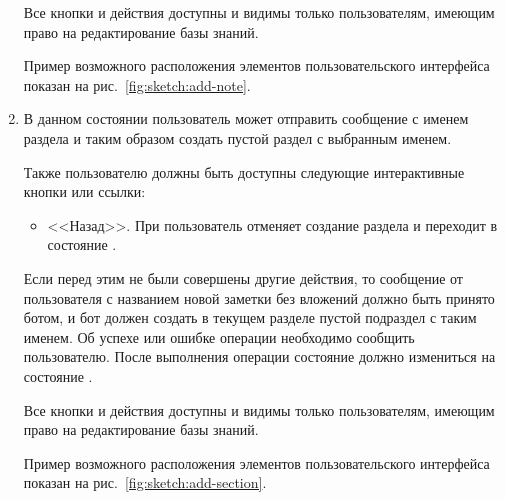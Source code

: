 \begin{enumerate}
            Все кнопки и действия доступны и видимы только пользователям, имеющим право на редактирование
            базы знаний.

            Пример возможного расположения элементов пользовательского интерфейса показан на
            рис.~\ref{fig:sketch:add-note}.

        \item \label{itm:req:ui:states:create-section}

            В данном состоянии пользователь может отправить сообщение с именем раздела и таким образом
            создать пустой раздел с выбранным именем.

            Также пользователю должны быть доступны следующие интерактивные кнопки или ссылки:
            \begin{itemize}
                \item
                    <<Назад>>.
                    При  пользователь отменяет создание раздела и
                    переходит в состояние
                    \hyperref[itm:req:ui:states:navx]
                    {}.
            \end{itemize}
            
            Если перед этим не были совершены другие действия, то сообщение от пользователя
            с названием новой заметки без вложений должно быть принято ботом, и
            бот должен создать в текущем разделе пустой подраздел с таким именем.
            Об успехе или ошибке операции необходимо сообщить пользователю.
            После выполнения операции состояние должно измениться на
            состояние \hyperref[itm:req:ui:states:navx]
            {}.

            Все кнопки и действия доступны и видимы только пользователям, имеющим право на редактирование
            базы знаний.

            Пример возможного расположения элементов пользовательского интерфейса показан на
            рис.~\ref{fig:sketch:add-section}.
    \end{enumerate}

